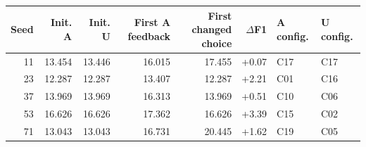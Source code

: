 \begin{tabular}{@{}rrrrrrll@{}}
\toprule
Seed & Init. A & Init. U & First A feedback & First changed choice & $\Delta$F1 & A config. & U config.\\
\midrule
11 & 13.454 & 13.446 & 16.015 & 17.455 & +0.07 & C17 & C17\\
23 & 12.287 & 12.287 & 13.407 & 12.287 & +2.21 & C01 & C16\\
37 & 13.969 & 13.969 & 16.313 & 13.969 & +0.51 & C10 & C06\\
53 & 16.626 & 16.626 & 17.362 & 16.626 & +3.39 & C15 & C02\\
71 & 13.043 & 13.043 & 16.731 & 20.445 & +1.62 & C19 & C05\\
\bottomrule
\end{tabular}
